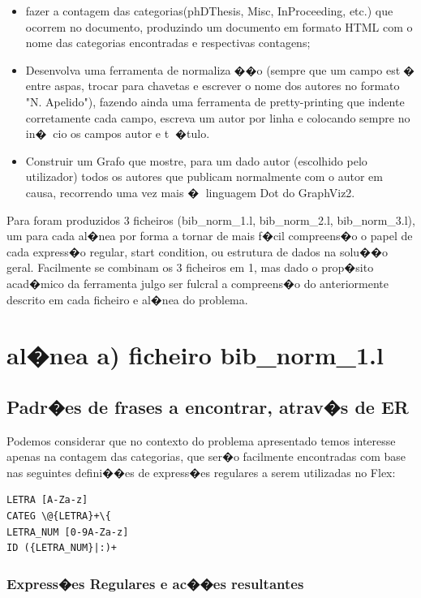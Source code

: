 \documentclass{report}
\begin{document}
\begin {itemize}
\item fazer a contagem das categorias(phDThesis, Misc, InProceeding, etc.) que ocorrem no documento, produzindo um documento em formato HTML com o nome das categorias encontradas e respectivas contagens;
\item Desenvolva uma ferramenta de normaliza��o (sempre que um campo est� entre aspas, trocar para chavetas e escrever o nome dos autores no formato "N. Apelido"), fazendo ainda uma ferramenta de pretty-printing que indente corretamente cada campo, escreva um autor por linha e colocando sempre no in�cio os campos autor e t�tulo.
\item Construir um Grafo que mostre, para um dado autor (escolhido pelo utilizador) todos os autores que publicam
normalmente com o autor em causa, recorrendo uma vez mais � linguagem Dot do GraphViz2.
\end{itemize}
Para foram produzidos 3 ficheiros (bib\_norm\_1.l, bib\_norm\_2.l, bib\_norm\_3.l), um para cada al�nea por forma a tornar de mais f�cil compreens�o o papel de cada express�o regular, start condition, ou estrutura de dados na solu��o geral. Facilmente se combinam os 3 ficheiros em 1, mas dado o prop�sito acad�mico da ferramenta julgo ser fulcral a compreens�o do anteriormente descrito em cada ficheiro e al�nea do problema.

\section{al�nea a) ficheiro bib\_norm\_1.l }
\subsection{Padr�es de frases a encontrar, atrav�s de ER}
Podemos considerar que no contexto do problema apresentado temos interesse apenas na contagem das categorias, que ser�o facilmente encontradas com base nas seguintes defini��es de express�es regulares a serem utilizadas no Flex:

\begin{lstlisting}
LETRA [A-Za-z]
CATEG \@{LETRA}+\{
LETRA_NUM [0-9A-Za-z]
ID ({LETRA_NUM}|:)+
\end{lstlisting}


\subsubsection{Express�es Regulares e ac��es resultantes}
\end{document}
